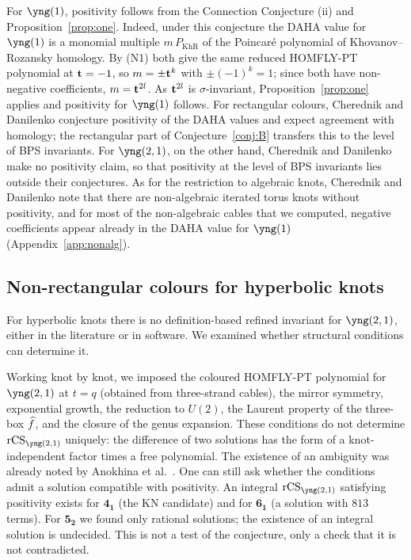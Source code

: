 For $\yng(1)$, positivity follows from the Connection Conjecture (ii) and Proposition~\ref{prop:one}.
Indeed, under this conjecture the DAHA value for $\yng(1)$ is a monomial multiple $m\,P_{\mathrm{KhR}}$ of the Poincar\'e polynomial of Khovanov--Rozansky homology.
By (N1) both give the same reduced HOMFLY-PT polynomial at $\mathbf{t}=-1$, so $m=\pm\mathbf{t}^k$ with $\pm(-1)^k=1$; since both have non-negative coefficients, $m=\mathbf{t}^{2l}$.
As $\mathbf{t}^{2l}$ is $\sigma$-invariant, Proposition~\ref{prop:one} applies and positivity for $\yng(1)$ follows.
For rectangular colours, Cherednik and Danilenko conjecture positivity of the DAHA values and expect agreement with homology; the rectangular part of Conjecture~\ref{conj:B} transfers this to the level of BPS invariants.
For $\yng(2,1)$, on the other hand, Cherednik and Danilenko make no positivity claim, so that positivity at the level of BPS invariants lies outside their conjectures.
As for the restriction to algebraic knots, Cherednik and Danilenko note that there are non-algebraic iterated torus knots without positivity,
and for most of the non-algebraic cables that we computed, negative coefficients appear already in the DAHA value for $\yng(1)$ (Appendix~\ref{app:nonalg}).

\subsection{Non-rectangular colours for hyperbolic knots}\label{sec:21}
For hyperbolic knots there is no definition-based refined invariant for $\yng(2,1)$, either in the literature or in software.
We examined whether structural conditions can determine it.

Working knot by knot, we imposed the coloured HOMFLY-PT polynomial for $\yng(2,1)$ at $t=q$ (obtained from three-strand cables), the mirror symmetry, exponential growth, the reduction to $U(2)$,
the Laurent property of the three-box $\widehat{f}$, and the closure of the genus expansion.
These conditions do not determine $\rCS_{\yng(2,1)}$ uniquely: the difference of two solutions has the form of a knot-independent factor times a free polynomial.
The existence of an ambiguity was already noted by Anokhina et al.\ \cite{Anokhina12}.
One can still ask whether the conditions admit a solution compatible with positivity.
An integral $\rCS_{\yng(2,1)}$ satisfying positivity exists for $\mathbf{4_1}$ (the KN candidate) and for $\mathbf{6_1}$ (a solution with $813$ terms).
For $\mathbf{5_2}$ we found only rational solutions; the existence of an integral solution is undecided.
This is not a test of the conjecture, only a check that it is not contradicted.

